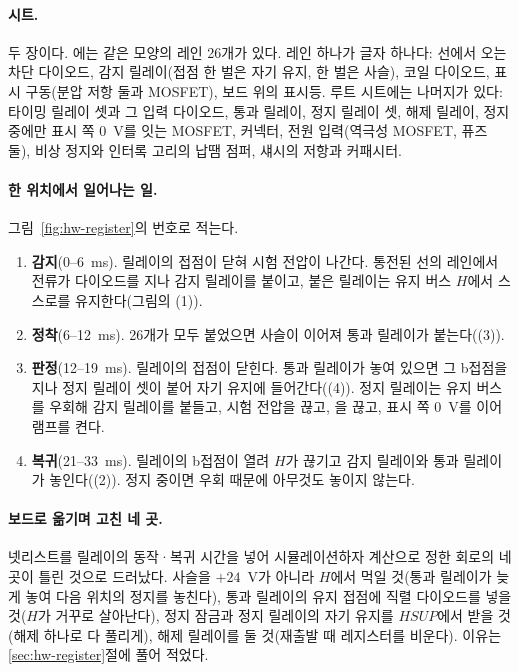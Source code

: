 \paragraph{시트.} 두 장이다. 에는 같은 모양의 레인 26개가 있다. 레인 하나가 글자 하나다: 선에서
오는 차단 다이오드, 감지 릴레이(접점 한 벌은 자기 유지, 한 벌은 사슬), 코일 다이오드, 표시 구동(분압 저항 둘과
MOSFET), 보드 위의 표시등. 루트 시트에는 나머지가 있다: 타이밍 릴레이 셋과 그 입력 다이오드, 통과 릴레이, 정지
릴레이 셋, 해제 릴레이, 정지 중에만 표시 쪽 0~V를 잇는 MOSFET, 커넥터, 전원 입력(역극성 MOSFET, 퓨즈 둘), 비상
정지와 인터록 고리의 납땜 점퍼, 섀시의 저항과 커패시터.

\paragraph{한 위치에서 일어나는 일.} 그림~\ref{fig:hw-register}의 번호로 적는다.

\begin{enumerate}
\item \textbf{감지}(0--6~ms).  릴레이의 접점이 닫혀 시험 전압이 나간다. 통전된 선의 레인에서 전류가
다이오드를 지나 감지 릴레이를 붙이고, 붙은 릴레이는 유지 버스 $H$에서 스스로를 유지한다(그림의 (1)).
\item \textbf{정착}(6--12~ms). 26개가 모두 붙었으면 사슬이 이어져 통과 릴레이가 붙는다((3)).
\item \textbf{판정}(12--19~ms).  릴레이의 접점이 닫힌다. 통과 릴레이가 놓여 있으면 그 b접점을 지나
정지 릴레이 셋이 붙어 자기 유지에 들어간다((4)). 정지 릴레이는 유지 버스를 우회해 감지 릴레이를 붙들고,
시험 전압을 끊고, 을 끊고, 표시 쪽 0~V를 이어 램프를 켠다.
\item \textbf{복귀}(21--33~ms).  릴레이의 b접점이 열려 $H$가 끊기고 감지 릴레이와 통과 릴레이가
놓인다((2)). 정지 중이면 우회 때문에 아무것도 놓이지 않는다.
\end{enumerate}

\paragraph{보드로 옮기며 고친 네 곳.} 넷리스트를 릴레이의 동작·복귀 시간을 넣어 시뮬레이션하자 계산으로 정한
회로의 네 곳이 틀린 것으로 드러났다. 사슬을 $+24$~V가 아니라 $H$에서 먹일 것(통과 릴레이가 늦게 놓여 다음
위치의 정지를 놓친다), 통과 릴레이의 유지 접점에 직렬 다이오드를 넣을 것($H$가 거꾸로 살아난다), 정지 잠금과
정지 릴레이의 자기 유지를 $HSUP$에서 받을 것(해제 하나로 다 풀리게), 해제 릴레이를 둘 것(재출발 때 레지스터를
비운다). 이유는 \ref{sec:hw-register}절에 풀어 적었다.

